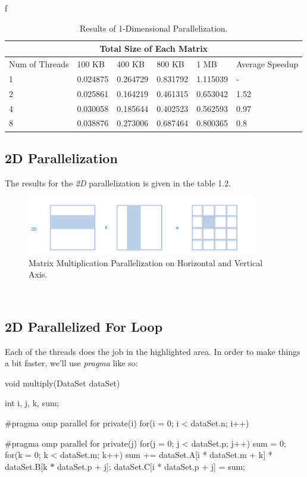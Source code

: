 f\documentclass[12pt]{article}
\numberwithin{equation}{section}
\numberwithin{table}{section}
\numberwithin{figure}{section}
\begin{document}
\def\arraystretch{1.3}
\begin{table}[!h]
		\centering
\begin{tabular}{ |p{3cm}||p{2cm}|p{2cm}|p{2cm}|p{2cm}|p{1.5cm}|  }
	
	\hline
	\multicolumn{6}{|c|}{Total Size of Each Matrix} \\
	\hline
	 Num of Threads & 100 KB & 400 KB & 800 KB & 1 MB & Average Speedup\\
	\hline
		1   & 0.024875    & 0.264729 & 0.831792 &   1.115039&   -\\
		2   & 0.025861    & 0.164219 & 0.461315 &   0.653042 &   1.52\\
		4   & 0.030058    & 0.185644 & 0.402523 &   0.562593&   0.97\\
		8   & 0.038876    & 0.273006 & 0.687464 &   0.800365& 0.8\\
	\hline
\end{tabular}
	\caption{Results of 1-Dimensional Parallelization.}
\label{figsolplot}
\end{table}
\newpage
\subsection{2D Parallelization}
The results for the \textit{2D} parallelization is given in the table 1.2.
\begin{figure}[!h]\centering
	\includegraphics[width=0.9\textwidth]{two_dimensional.png}
	\caption{Matrix Multiplication Parallelization on Horizontal and Vertical Axis.}
	\label{figsolplot}
\end{figure}\\
\subsection{2D Parallelized For Loop}
Each of the threads does the job in the highlighted area.
In order to make things a bit faster, we'll use \textit{pragma} like so:
\begin{cpp}
		void multiply(DataSet dataSet){
			int i, j, k, sum;
			
			#pragma omp parallel for private(i)
			for(i = 0; i < dataSet.n; i++){
				
				#pragma omp parallel for private(j)
				for(j = 0; j < dataSet.p; j++){
					sum = 0;
					for(k = 0; k < dataSet.m; k++){
						sum += dataSet.A[i * dataSet.m + k] * dataSet.B[k * dataSet.p + j];
					}
					dataSet.C[i * dataSet.p + j] = sum;
				}
			}
		}
\end{cpp}
\end{document}
